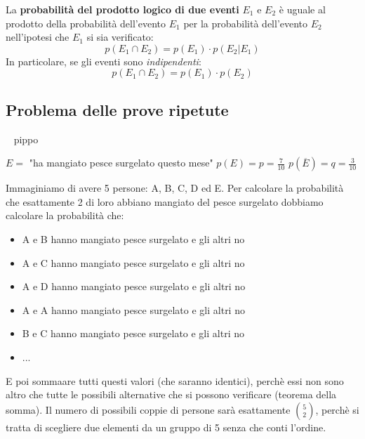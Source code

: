 \documentclass{article}     %
\begin{document}
                \begin{thm}
                    La \textbf{probabilità del prodotto logico di due eventi} $E_1$ e $E_2$ è uguale al prodotto della probabilità dell'evento $E_1$ per la probabilità dell'evento $E_2$ nell'ipotesi che $E_1$ si sia verificato:
                    \[p(E_1\cap E_2)=p(E_1)\cdot p(E_2|E_1)\]
                    In particolare, se gli eventi sono \textit{indipendenti}:
                    \[p(E_1\cap E_2)=p(E_1)\cdot p(E_2)\]
                \end{thm}

            \subsection{Problema delle prove ripetute}~
            pippo
                \begin{ex}
                    \noindent
                $E=$ "ha mangiato pesce surgelato questo mese" \qquad
                $p(E)=p=\frac{7}{10}$ \qquad
                $p(\overline{E})=q=\frac{3}{10}$

                Immaginiamo di avere 5 persone: A, B, C, D ed E. Per calcolare la probabilità che esattamente 2 di loro abbiano mangiato del pesce surgelato dobbiamo calcolare la probabilità che:
                \begin{itemize}
                    \item A e B hanno mangiato pesce surgelato e gli altri no
                    \item A e C hanno mangiato pesce surgelato e gli altri no
                    \item A e D hanno mangiato pesce surgelato e gli altri no
                    \item A e A hanno mangiato pesce surgelato e gli altri no
                    \item B e C hanno mangiato pesce surgelato e gli altri no
                    \item ...
                \end{itemize}
                E poi sommaare tutti questi valori (che saranno identici), perchè essi non sono altro che tutte le possibili alternative che si possono verificare (teorema della somma). Il numero di possibili coppie di persone sarà esattamente $\binom{5}{2}$, perchè si tratta di scegliere due elementi da un gruppo di 5 senza che conti l'ordine. 


\end{ex}
\end{document}
